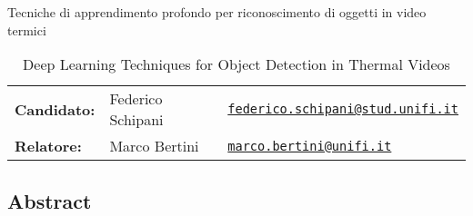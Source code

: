 \documentclass{article}
\begin{document}
\begin{table}[]
\centering
\caption*{Tecniche di apprendimento profondo per riconoscimento di oggetti in video termici}
\caption*{Deep Learning Techniques for Object Detection in Thermal Videos}
\begin{tabular}{lll}
\textbf{Candidato:}   & Federico Schipani & \href{mailto:federico.schipani@stud.unifi.it}{\texttt{federico.schipani@stud.unifi.it}}  \\
\textbf{Relatore:}    & Marco Bertini  & \href{mailto:marco.bertini@unifi.it}{\texttt{marco.bertini@unifi.it}}                           \\
\end{tabular}
\end{table}
\subsection*{Abstract}
\end{document}
